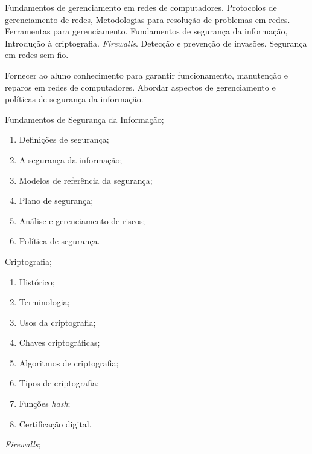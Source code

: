 \begin{pud}
	
	
	\ementa
	Fundamentos de gerenciamento em redes de computadores. Protocolos de gerenciamento de redes, Metodologias para resolução de problemas em redes. Ferramentas para gerenciamento. Fundamentos de segurança da informação, Introdução à criptografia. \textit{Firewalls}. Detecção e prevenção de invasões. Segurança em redes sem fio. 
	
	
	\objetivos
	Fornecer ao aluno conhecimento para garantir funcionamento, manutenção e reparos em redes de computadores. Abordar aspectos de gerenciamento e políticas de segurança da informação.
	
	\programa
	\begin{description}[itemsep=0em]
		\item[UNIDADE I:]Fundamentos de Segurança da Informação; 
	         \begin{enumerate}[itemsep=0em, topsep=0em]
				\item Definições de segurança;
				\item A segurança da informação;
				\item Modelos de referência da segurança;
				\item Plano de segurança;
				\item Análise e gerenciamento de riscos;
				\item Política de segurança.
	        \end{enumerate}
	        
	    \item[UNIDADE II:] Criptografia;
	         \begin{enumerate}[itemsep=0em, topsep=0em]
				\item Histórico;
				\item Terminologia;
				\item Usos da criptografia;
				\item Chaves criptográficas;
				\item Algoritmos de criptografia;
				\item Tipos de criptografia;
				\item Funções \textit{hash};
				\item Certificação digital.
	        \end{enumerate}
	
		\item[UNIDADE III:] \textit{Firewalls};
	        

\end{description}
\end{pud}

